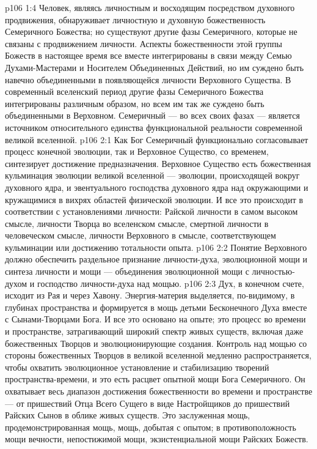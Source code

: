 \vs p106 1:4 Человек, являясь личностным и восходящим посредством духовного продвижения, обнаруживает личностную и духовную божественность Семеричного Божества; но существуют другие фазы Семеричного, которые не связаны с продвижением личности. Аспекты божественности этой группы Божеств в настоящее время все вместе интегрированы в связи между Семью Духами\hyp{}Мастерами и Носителем Объединенных Действий, но им суждено быть навечно объединенными в появляющейся личности Верховного Существа. В современный вселенский период другие фазы Семеричного Божества интегрированы различным образом, но всем им так же суждено быть объединенными в Верховном. Семеричный --- во всех своих фазах --- является источником относительного единства функциональной реальности современной великой вселенной.
\vs p106 2:1 Как Бог Семеричный функционально согласовывает процесс конечной эволюции, так и Верховное Существо, со временем, синтезирует достижение предназначения. Верховное Существо есть божественная кульминация эволюции великой вселенной --- эволюции, происходящей вокруг духовного ядра, и эвентуального господства духовного ядра над окружающими и кружащимися в вихрях областей физической эволюции. И все это происходит в соответствии с установлениями личности: Райской личности в самом высоком смысле, личности Творца во вселенском смысле, смертной личности в человеческом смысле, личности Верховного в смысле, соответствующем кульминации или достижению тотальности опыта.
\vs p106 2:2 \pc Понятие Верховного должно обеспечить раздельное признание личности\hyp{}духа, эволюционной мощи и синтеза личности и мощи --- объединения эволюционной мощи с личностью\hyp{}духом и господство личности\hyp{}духа над мощью.
\vs p106 2:3 Дух, в конечном счете, исходит из Рая и через Хавону. Энергия\hyp{}материя выделяется, по\hyp{}видимому, в глубинах пространства и формируется в мощь детьми Бесконечного Духа вместе с Сынами\hyp{}Творцами Бога. И все это основано на опыте; это процесс во времени и пространстве, затрагивающий широкий спектр живых существ, включая даже божественных Творцов и эволюционирующие создания. Контроль над мощью со стороны божественных Творцов в великой вселенной медленно распространяется, чтобы охватить эволюционное установление и стабилизацию творений пространства\hyp{}времени, и это есть расцвет опытной мощи Бога Семеричного. Он охватывает весь диапазон достижения божественности во времени и пространстве --- от пришествий Отца Всего Сущего в виде Настройщиков до пришествий Райских Сынов в облике живых существ. Это заслуженная мощь, продемонстрированная мощь, мощь, добытая с опытом; в противоположность мощи вечности, непостижимой мощи, экзистенциальной мощи Райских Божеств.
